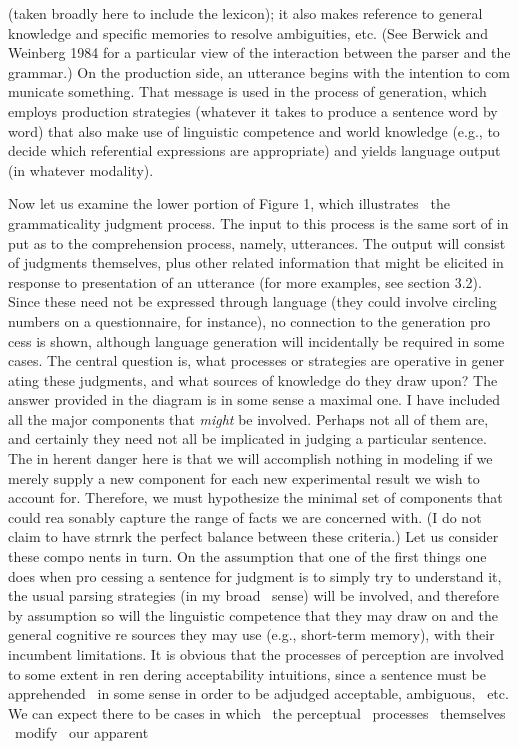 \clearpage\setcounter{page}{1}\begin{styleStandard}
(taken broadly here to include the lexicon); it also makes reference to general knowledge and specific memories to resolve ambiguities, etc. (See Berwick and Weinberg 1984 for a particular view of the interaction between the parser and the grammar.) On the production side, an utterance begins with the intention to com\- municate something. That message is used in the process of generation, which employs production strategies (whatever it takes to produce a sentence word by word) that also make use of linguistic competence and world knowledge (e.g., to decide which referential expressions are appropriate) and yields language output (in whatever modality).
\end{styleStandard}


\begin{styleStandard}
Now let us examine the lower portion of Figure 1, which illustrates \ the grammaticality judgment process. The input to this process is the same sort of in\- put as to the comprehension process, namely, utterances. The output will consist of judgments themselves, plus other related information that might be elicited in response to presentation of an utterance (for more examples, see section 3.2). Since these need not be expressed through language (they could involve circling numbers on a questionnaire, for instance), no connection to the generation pro\- cess is shown, although language generation will incidentally be required in some cases. The central question is, what processes or strategies are operative in gener\- ating these judgments, and what sources of knowledge do they draw upon? The answer provided in the diagram is in some sense a maximal one. I have included all the major components that \textit{might}\textit{ }be involved. Perhaps not all of them are, and certainly they need not all be implicated in judging a particular sentence. The in\- herent danger here is that we will accomplish nothing in modeling if we merely supply a new component for each new experimental result we wish to account for. Therefore, we must hypothesize the minimal set of components that could rea\- sonably capture the range of facts we are concerned with. (I do not claim to have strnrk the perfect balance between these criteria.) Let us consider these compo\- nents in turn. On the assumption that one of the first things one does when pro\- cessing a sentence for judgment is to simply try to understand it, the usual parsing strategies (in my broad \ sense) will be involved, and therefore by assumption so will the linguistic competence that they may draw on and the general cognitive re\- sources they may use (e.g., short-term memory), with their incumbent limitations. {\textquotedbl}It is obvious that the processes of perception are involved to some extent in ren\- dering acceptability intuitions, since a sentence must be apprehended \ in some sense in order to be adjudged acceptable, ambiguous, \ etc. We can expect there to be cases in which \ the perceptual \ processes \ themselves \ modify \ our apparent
\end{styleStandard}


